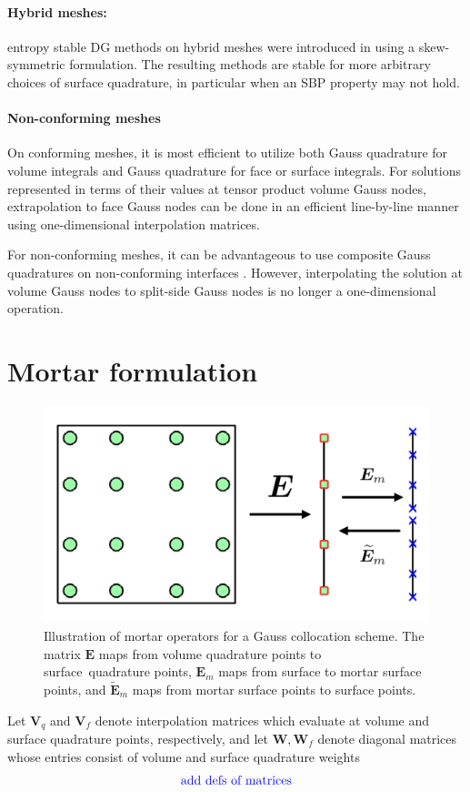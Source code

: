 \documentclass[review]{siamart0216}
\renewcommand{\tilde}{\widetilde}
\newcommand{\note}[1]{{\color{blue}{#1}}}
\begin{document}
\paragraph{Hybrid meshes:} entropy stable DG methods on hybrid meshes were introduced in \cite{chan2019skew} using a skew-symmetric formulation.  The resulting methods are stable for more arbitrary choices of surface quadrature, in particular when an SBP property may not hold.  

\paragraph{Non-conforming meshes}

On conforming meshes, it is most efficient to utilize both Gauss quadrature for volume integrals and Gauss quadrature for face or surface integrals.  For solutions represented in terms of their values at tensor product volume Gauss nodes, extrapolation to face Gauss nodes can be done in an efficient line-by-line manner using one-dimensional interpolation matrices.  

For non-conforming meshes, it can be advantageous to use composite Gauss quadratures on non-conforming interfaces \cite{Kozdon2018}.  However, interpolating the solution at volume Gauss nodes to split-side Gauss nodes is no longer a one-dimensional operation.  

\section{Mortar formulation}

\begin{figure}[!h]
\centering
\includegraphics[width=.5\textwidth]{figs/mortar.png}
\caption{Illustration of mortar operators for a Gauss collocation scheme.  The matrix $\bm{E}$ maps from volume quadrature points to surface quadrature points, $\bm{E}_m$ maps from surface to mortar surface points, and $\tilde{\bm{E}}_m$ maps from mortar surface points to surface points. }
\label{fig:gqcon_noncon}
\end{figure}

Let $\bm{V}_q$ and $\bm{V}_f$ denote interpolation matrices which evaluate at volume and surface quadrature points, respectively, and let $\bm{W}, \bm{W}_f$ denote diagonal matrices whose entries consist of volume and surface quadrature weights
\[
\text{\note{add defs of matrices}}
\]
\end{document}
